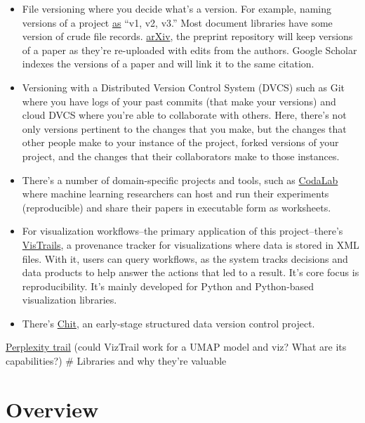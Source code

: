 \documentclass[
]{article}
\providecommand{\tightlist}{%
  \setlength{\itemsep}{0pt}\setlength{\parskip}{0pt}}\usepackage{longtable,booktabs,array}
\begin{document}
\begin{itemize}
\tightlist
\item
  File versioning where you decide what's a version. For example, naming
  versions of a project
  \href{https://researchdata.wisc.edu/news/version-control-for-research-projects/}{as}
  ``v1, v2, v3.'' Most document libraries have some version of crude
  file records. \href{https://arxiv.org/}{arXiv}, the preprint
  repository will keep versions of a paper as they're re-uploaded with
  edits from the authors. Google Scholar indexes the versions of a paper
  and will link it to the same citation.
\item
  Versioning with a Distributed Version Control System (DVCS) such as
  Git where you have logs of your past commits (that make your versions)
  and cloud DVCS where you're able to collaborate with others. Here,
  there's not only versions pertinent to the changes that you make, but
  the changes that other people make to your instance of the project,
  forked versions of your project, and the changes that their
  collaborators make to those instances.
\item
  There's a number of domain-specific projects and tools, such as
  \href{https://codalab.org/}{CodaLab} where machine learning
  researchers can host and run their experiments (reproducible) and
  share their papers in executable form as worksheets.
\item
  For visualization workflows--the primary application of this
  project--there's
  \href{https://www.vistrails.org//index.php/Main_Page}{VisTrails}, a
  provenance tracker for visualizations where data is stored in XML
  files. With it, users can query workflows, as the system tracks
  decisions and data products to help answer the actions that led to a
  result. It's core focus is reproducibility. It's mainly developed for
  Python and Python-based visualization libraries.
\item
  There's \href{https://github.com/davidad/chit}{Chit}, an early-stage
  structured data version control project.
\end{itemize}

\href{https://www.perplexity.ai/search/overview-of-viztrails-fCsottRfQR6P0aoMyMLVZg}{Perplexity
trail} (could VizTrail work for a UMAP model and viz? What are its
capabilities?) \# Libraries and why they're valuable

\section{Overview}\label{overview}
\end{document}

